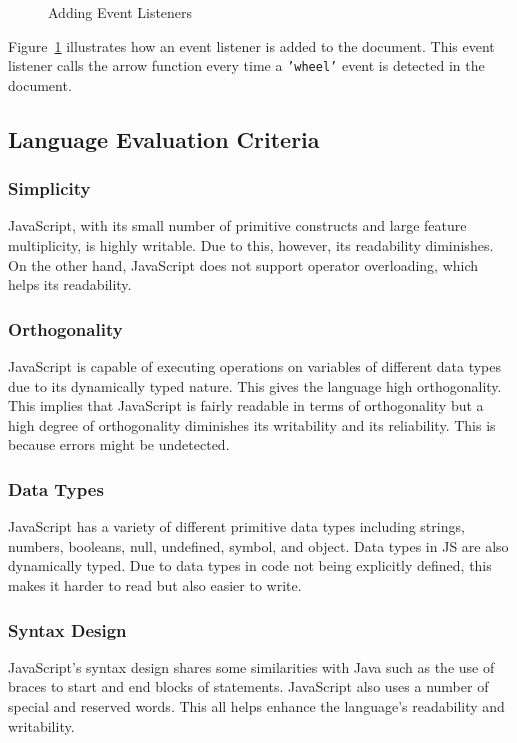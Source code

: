 \documentclass{article}
\newcommand{\js}[1]{\inputminted{javascript}{samples/js/#1.js}}
\newcommand{\jsin}[1]{\texttt{#1}}
\begin{document}
  \begin{figure}[ht]
    \js{events}
    \caption{Adding Event Listeners}
    \label{fig:events}
  \end{figure}

  Figure~\ref{fig:events} illustrates how an event listener is added to the
  document. This event listener calls the arrow function every time a
  \jsin{'wheel'} event is detected in the document.


  \subsection{Language Evaluation Criteria}

  \subsubsection{Simplicity}
  JavaScript, with its small number of primitive constructs and large feature
  multiplicity, is highly writable. Due to this, however, its readability
  diminishes. On the other hand, JavaScript does not support operator
  overloading, which helps its readability.

  \subsubsection{Orthogonality}
  JavaScript is capable of executing operations on variables of different data
  types due to its dynamically typed nature. This gives the language high
  orthogonality. This implies that JavaScript is fairly readable in terms of
  orthogonality but a high degree of orthogonality diminishes its writability
  and its reliability. This is because errors might be undetected.

  \subsubsection{Data Types}
  JavaScript has a variety of different primitive data types including strings,
  numbers, booleans, null, undefined, symbol, and object. Data types in JS are
  also dynamically typed. Due to data types in code not being explicitly
  defined, this makes it harder to read but also easier to write.

  \subsubsection{Syntax Design}
  JavaScript’s syntax design shares some similarities with Java such as the use
  of braces to start and end blocks of statements. JavaScript also uses a number
  of special and reserved words. This all helps enhance the language’s
  readability and writability.
\end{document}
